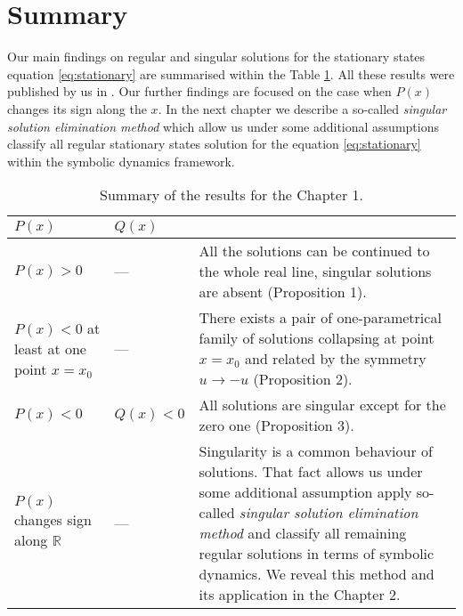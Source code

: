 \section{Summary}

Our main findings on regular and singular solutions for the stationary states equation \eqref{eq:stationary} are summarised within the Table \ref{tab:first-chapter-results}.
All these results were published by us in \cite{AlfimovLebedev}.
Our further findings are focused on the case when $P(x)$ changes its sign along the $x$.
In the next chapter we describe a so-called {\it singular solution elimination method} which allow us under some additional assumptions classify all regular stationary states solution for the equation \eqref{eq:stationary} within the symbolic dynamics framework.

\begin{table}[h!]
	\centering
	\begin{tabular}{ | p{4cm} | l || p{10cm} | }
		\hline
		$P(x)$ & $Q(x)$ & \\
		\hline
		$P(x) > 0$ & --- & All the solutions can be continued to the whole real line, singular solutions are absent (Proposition 1). \\
		\hline
		$P(x) < 0$ at least at one point $x = x_0$ & --- & There exists a pair of one-parametrical family of solutions collapsing at point $x = x_0$ and related by the symmetry $u \to -u$ (Proposition 2). \\
		\hline
		$P(x) < 0$ & $Q(x) < 0$ & All solutions are singular except for the zero one (Proposition 3). \\
		\hline
		$P(x)$ changes sign along $\mathbb{R}$ & --- & Singularity is a common behaviour of solutions.
		That fact allows us under some additional assumption apply so-called {\it singular solution elimination method} and classify all remaining regular solutions in terms of symbolic dynamics.
		We reveal this method and its application in the Chapter 2. \\
		\hline
	\end{tabular}
	\caption{Summary of the results for the Chapter 1.}
	\label{tab:first-chapter-results}
\end{table}
